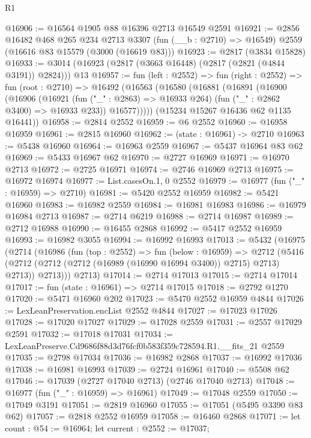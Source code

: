 \begin{lexlean}{R1}
\begin{coremodule}
@16906 := @16564 @1905 @88 @16396 @2713 @16549 @2591
@16921 := @2856
    @16482
    @468
    @265
    @234
    @2713
    @3307
    (fun (__b : @2710) => @16549)
    @2559
    (@16616 @83 @15579 (@3000 (@16619 @83)))
@16923 := @2817 (@3834 @15828)
@16933 := @3014 (@16923 (@2817 (@3663 @16448) (@2817 (@2821 (@4844 @3191)) @2824))) @13
@16957 := fun (left : @2552) =>
  fun (right : @2552) =>
  fun (root : @2710) =>
  @16492
    (@16563
      (@16580
        (@16881
          (@16891
            (@16900
              (@16906
                (@16921 (fun ("_" : @2863) => @16933 @264) (fun ("_" : @2862 @3400) => @16933 @233))
                @16577)))))
      (@15234 @15267 @16436 @62 @1135 @16441))
@16958 := @2814 @2552
@16959 := @6 @2552
@16960 := @16958 @16959
@16961 := @2815 @16960
@16962 := (state : @16961) -> @2710
@16963 := @5438 @16960
@16964 := @16963 @2559
@16967 := @5437 @16964 @83 @62
@16969 := @5433 @16967 @62
@16970 := @2727 @16969
@16971 := @16970 @2713
@16972 := @2725 @16971
@16974 := @2746 @16969 @2713
@16975 := @16972 @16974
@16977 := List.casesOn.{1, 0} @2552
@16979 := @16977 (fun ("_" : @16959) => @2710)
@16981 := @5420 @2552 @16959
@16982 := @5421 @16960
@16983 := @16982 @2559
@16984 := @16981 @16983
@16986 := @16979 @16984 @2713
@16987 := @2714 @6219
@16988 := @2714 @16987
@16989 := @2712 @16988
@16990 := @16455 @2868
@16992 := @5417 @2552 @16959
@16993 := @16982 @3055
@16994 := @16992 @16993
@17013 := @5432
    (@16975
      (@2714
        (@16986
          (fun (top : @2552) =>
          fun (below : @16959) =>
          @2712
            (@5416 (@2712 (@2712 (@2712 (@16989 (@16990 @16994 @3400)) @2715) @2713) @2713))
            @2713)))
      @2713)
@17014 := @2714 @17013
@17015 := @2714 @17014
@17017 := fun (state : @16961) => @2714 @17015
@17018 := @2792 @1270
@17020 := @5471 @16960 @202
@17023 := @5470 @2552 @16959 @4844
@17026 := LexLeanPreservation.encList @2552 @4844
@17027 := @17023 @17026
@17028 := @17020 @17027
@17029 := @17028 @2559
@17031 := @2557 @17029 @2591
@17032 := @17018 @17031
@17034 := LexLeanPreserve.Cd9686f88d3d76fcf0b583f359c728594.R1.__fits_21 @2559
@17035 := @2798 @17034
@17036 := @16982 @2868
@17037 := @16992 @17036
@17038 := @16981 @16993
@17039 := @2724 @16961
@17040 := @5508 @62
@17046 := @17039 (@2727 @17040 @2713) (@2746 @17040 @2713)
@17048 := @16977 (fun ("_" : @16959) => @16961)
@17049 := @17048 @2559
@17050 := @17049 @3191
@17051 := @2819 @16960
@17055 := @17051 (@5495 @3390 @83 @62)
@17057 := @2818 @2552 @16959
@17058 := @16460 @2868
@17071 := let count : @54 := @16964;
  let current : @2552 := @17037;

\end{coremodule}
\end{lexlean}
